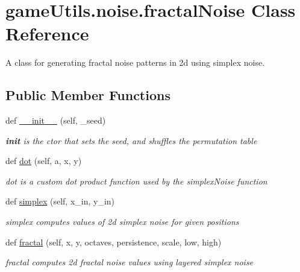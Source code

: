 \hypertarget{classgame_utils_1_1noise_1_1fractal_noise}{}\section{game\+Utils.\+noise.\+fractal\+Noise Class Reference}
\label{classgame_utils_1_1noise_1_1fractal_noise}


A class for generating fractal noise patterns in 2d using simplex noise.  


\subsection*{Public Member Functions}
\begin{DoxyCompactItemize}
\item 
def \hyperlink{classgame_utils_1_1noise_1_1fractal_noise_ade7e97ec15b5dd751cbf36f3837e277c}{\+\_\+\+\_\+init\+\_\+\+\_\+} (self, \+\_\+seed)
\begin{DoxyCompactList}\small\item\em {\bfseries init} is the ctor that sets the seed, and shuffles the permutation table \end{DoxyCompactList}\item 
def \hyperlink{classgame_utils_1_1noise_1_1fractal_noise_a21b335cbeadcf4dfa15ecd9649942eec}{dot} (self, a, x, y)
\begin{DoxyCompactList}\small\item\em dot is a custom dot product function used by the simplex\+Noise function \end{DoxyCompactList}\item 
def \hyperlink{classgame_utils_1_1noise_1_1fractal_noise_a80be6ac648b1f34003f5cf6f6b47da92}{simplex} (self, x\+\_\+in, y\+\_\+in)
\begin{DoxyCompactList}\small\item\em simplex computes values of 2d simplex noise for given positions \end{DoxyCompactList}\item 
def \hyperlink{classgame_utils_1_1noise_1_1fractal_noise_ad89dfce1e3fceb45e2a28444127fab73}{fractal} (self, x, y, octaves, persistence, scale, low, high)
\begin{DoxyCompactList}\small\item\em fractal computes 2d fractal noise values using layered simplex noise \end{DoxyCompactList}\end{DoxyCompactItemize}
